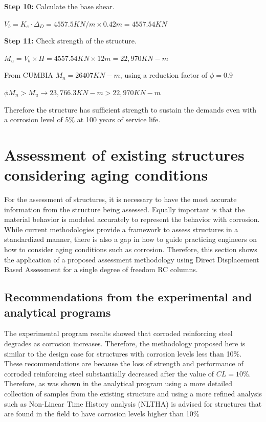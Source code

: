 \textbf{Step 10:} Calculate the base shear.

$\displaystyle V_{b}=K_{e} \cdot \Delta_{D}= 4557.5 KN/m \times 0.42m = 4557.54 KN$

\textbf{Step 11:} Check strength of the structure.

$M_{u}=V_{b} \times H=4557.54 KN \times 12m = 22,970 KN-m$

From CUMBIA $M_{n} = 26407 KN-m$, using a reduction factor of $\phi=0.9$

$\phi M_{n}>M_{u} \to 23,766.3 KN-m > 22,970 KN-m$

Therefore the structure has sufficient strength to sustain the demands even with a corrosion level of 5\% at 100 years of service life.

\section{Assessment of existing structures considering aging conditions}

For the assessment of structures, it is necessary to have the most accurate information from the structure being assessed. Equally important is that the material behavior is modeled accurately to represent the behavior with corrosion. While current methodologies provide a framework to assess structures in a standardized manner, there is also a gap in how to guide practicing engineers on how to consider aging conditions such as corrosion. Therefore, this section shows the application of a proposed assessment methodology using Direct Displacement Based Assessment for a single degree of freedom RC columns. 

\subsection{Recommendations from the experimental and analytical programs}

The experimental program results showed that corroded reinforcing steel degrades as corrosion increases. Therefore, the methodology proposed here is similar to the design case for structures with corrosion levels less than 10\%. These recommendations are because the loss of strength and performance of corroded reinforcing steel substantially decreased after the value of $CL=10\%$. Therefore, as was shown in the analytical program using a more detailed collection of samples from the existing structure and using a more refined analysis such as Non-Linear Time History analysis (NLTHA) is advised for structures that are found in the field to have corrosion levels higher than 10\%

